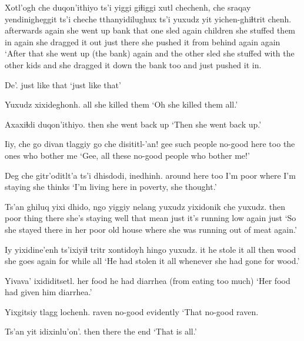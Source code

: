 \documentclass[12pt]{article}
\begin{document}
\gll Xotl'ogh che duqon'ithiyo ts'i yiggi giɬiggi xutl chechenh, che sraqay yendinigheggit ts'i cheche tthanyidilughux ts'i yuxudz yit yichen-ghiɬtrit chenh.
afterwards again {she went up bank} {} that one sled again {} children {she stuffed them in} {} again {she dragged it out} {} just there {she pushed it from behind again} again
\glt `After that she went up (the bank) again and the other sled she stuffed with the other kids and she dragged it down the bank too and just pushed it in.
\glend

\gll De'.
{{just like that}}
\glt `just like that'
\glend

\gll Yuxudz xixideghonh.
all {she killed them}
\glt `Oh she killed them all.'
\glend

\gll Axaxiɬdi duqon'ithiyo.
then {she went back up}
\glt `Then she went back up.'
\glend

\gll Iiy, {che go divan} tlaggiy go che disititl-'an!
gee {such people} no-good {} here too {the ones who bother me}
\glt `Gee, all these no-good people who bother me!'
\glend

\gll Deg che gitr'oditlt'a ts'i dhisdodi, inedhinh.
{around here} too {I'm poor} {} {where I'm staying} {she thinks}
\glt `I'm living here in poverty, she thought.'
\glend

\gll Ts'an ghiluq yixi dhido, ngo yiggiy nelang yuxudz yixidonik che yuxudz. 
then {poor thing} there {she's staying} well that mean just {it's running low} again just 
\glt `So she stayed there in her poor old house where she was running out of meat again.'
\glend

\gll Iy yixidine'enh ts'ixiyiɬ tritr xontidoyh hingo yuxudz. 
it {he stole it all} then wood {she goes again for} while all
\glt `He had stolen it all whenever she had gone for wood.'
\glend

\gll Yivava' ixididitsetl.
{her food} {he had diarrhea (from eating too much)}
\glt  `Her food had given him diarrhea.'
\glend

\gll Yixgitsiy tlagg lochenh.
raven no-good evidently
\glt `That no-good raven.
\glend

\gll Ts'an yit idixinlu'on'.
then there {the end}
\glt `That is all.'
\glend
\end{document}

